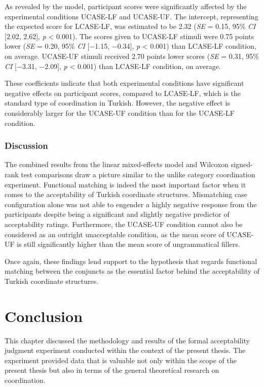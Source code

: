 As revealed by the model, participant scores were significantly affected by the experimental conditions UCASE-LF and UCASE-UF. The intercept, representing the expected score for LCASE-LF, was estimated to be 2.32 (\textit{SE} = 0.15, 95\% \textit{CI} [2.02, 2.62], \textit{p} < 0.001). The scores given to UCASE-LF stimuli were 0.75 points lower (\textit{SE} = 0.20, 95\% \textit{CI} [$-$1.15, $-$0.34], \textit{p} < 0.001) than LCASE-LF condition, on average. UCASE-UF stimuli received 2.70 points lower scores (\textit{SE} = 0.31, 95\% \textit{CI} [$-$3.31, $-$2.09], \textit{p} < 0.001) than LCASE-LF condition, on average.

These coefficients indicate that both experimental conditions have significant negative effects on participant scores, compared to LCASE-LF, which is the standard type of coordination in Turkish. However, the negative effect is considerably larger for the UCASE-UF condition than for the UCASE-LF condition.

\subsubsection{Discussion}

The combined results from the linear mixed-effects model and Wilcoxon signed-rank test comparisons draw a picture similar to the unlike category coordination experiment. Functional matching is indeed the most important factor when it comes to the acceptability of Turkish coordinate structures. Mismatching case configuration alone was not able to engender a highly negative response from the participants despite being a significant and slightly negative predictor of acceptability ratings. Furthermore, the UCASE-UF condition cannot also be considered as an outright unacceptable condition, as the mean score of UCASE-UF is still significantly higher than the mean score of ungrammatical fillers.

Once again, these findings lend support to the hypothesis that regards functional matching between the conjuncts as the essential factor behind the acceptability of Turkish coordinate structures.

\section{Conclusion} \label{sec:conclusionexp}

This chapter discussed the methodology and results of the formal acceptability judgment experiment conducted within the context of the present thesis. The experiment provided data that is valuable not only within the scope of the present thesis but also in terms of the general theoretical research on coordination.

